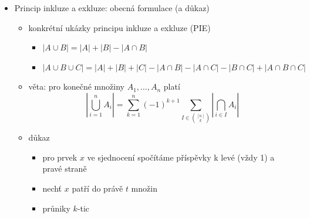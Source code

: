 \begin{itemize}
\begin{itemize}
\begin{itemize}
\end{itemize}
\item ${n-1\choose k-1}+{n-1\choose k}={n\choose k}$
\begin{itemize}
\item zvolíme jeden prvek $a$ a rozdělíme všechny k-prvkové podmnožiny podle toho, zda obsahují $a$, nebo ne
\item buňka v Pascalově trojúhelníku je součtem dvou buněk nad ní (pokud není na kraji)
\end{itemize}
\item Binomická věta: $(x+y)^n=\sum_{i=0}^n{n\choose i}x^{n-i}y^i$
\item aplikace
\begin{itemize}
\item řádek Pascalova trojúhelníku se sečte na $2^n=(1+1)^n=\sum_{k=0}^n\binom{n}{k}$
\item důkaz $(x^n)'=nx^{n-1}$
\begin{itemize}
\item použijeme $f(x+h)=(x+h)^n=x^n+nx^{n-1}h+\binom n2 x^{n-2}h^2+\dots+h^n$
\item dosadíme do $\lim_{h\to 0}\frac{f(x+h)-f(x)}{h}$
\end{itemize}
\item $e=\lim\,(1+\frac1n)^n$
\end{itemize}
\end{itemize}
\item Princip inkluze a exkluze: obecná formulace (a důkaz)
\begin{itemize}
\item konkrétní ukázky principu inkluze a exkluze (PIE)
\begin{itemize}
\item $|A\cup B|=|A|+|B|-|A\cap B|$
\item $|A\cup B\cup C|=|A|+|B|+|C|-|A\cap B|-|A\cap C|-|B\cap C|+|A\cap B\cap C|$
\end{itemize}
\item věta: pro konečné množiny $A_1,\dots,A_n$ platí \[|\bigcup_{i=1}^nA_i|=\sum_{k=1}^n(-1)^{k+1}\sum_{I\in{[n]\choose k}}|\bigcap_{i\in I}A_i|\]
\item důkaz
\begin{itemize}
\item pro prvek $x$ ve sjednocení spočítáme příspěvky k levé (vždy 1) a pravé straně
\item nechť $x$ patří do právě $t$ množin
\item průniky $k$-tic
\begin{itemize}

\end{itemize}
\end{itemize}
\end{itemize}
\end{itemize}
